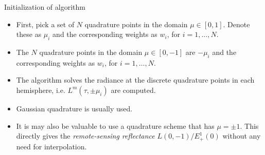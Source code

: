 \documentclass[14]{beamer}
\begin{document}
\begin{frame}{Initialization of algorithm}
  \begin{itemize}
  \item First, pick a set of $N$ quadrature points in the domain $\mu
    \in[0,1]$. Denote these as $\mu_i$ and the corresponding weights as
    $w_i$, for $i=1,\ldots,N$.
  \item The $N$ quadrature points in the domain $\mu \in[0,-1]$ are
    $-\mu_i$ and the corresponding weights as $w_i$, for
    $i=1,\ldots,N$.
  \item The algorithm solves the radiance at the discrete quadrature
    points in each hemisphere, i.e. $L^m(\tau,\pm \mu_i)$ are
    computed.
  \item Gaussian quadrature is usually used. 
  \item It is may also be valuable to use a quadrature scheme that has
    $\mu = \pm 1$. This directly gives the \emph{remote-sensing
      reflectance} $L(0,-1)/E_+^1(0)$ without any need for
    interpolation.
  \end{itemize}
\end{frame}
\end{document}
